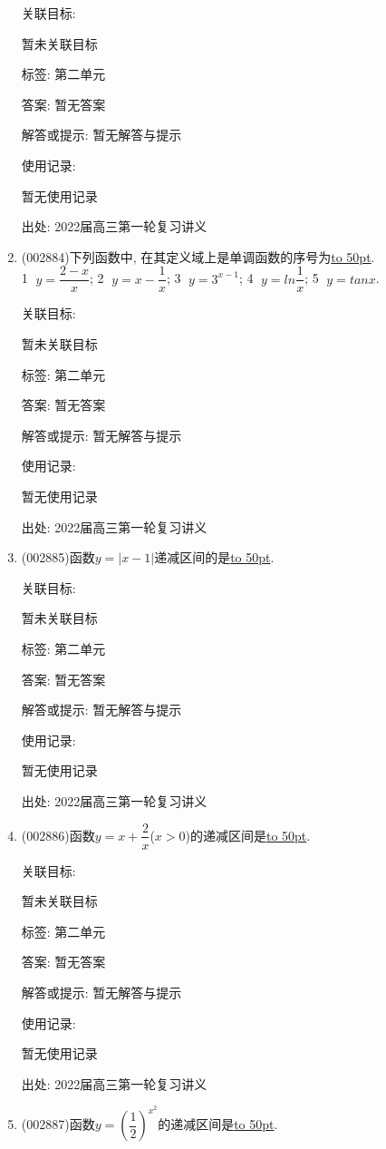 \documentclass[10pt,a4paper]{article}
\newcommand{\blank}[1]{\underline{\hbox to #1pt{}}}
\begin{document}
\begin{enumerate}[1.]
关联目标:

暂未关联目标



标签: 第二单元

答案: 暂无答案

解答或提示: 暂无解答与提示

使用记录:

暂无使用记录


出处: 2022届高三第一轮复习讲义
\item { (002884)}下列函数中, 在其定义域上是单调函数的序号为\blank{50}.\\
\textcircled{1} $y=\dfrac{2-x}x$; \textcircled{2} $y=x-\dfrac 1x$; \textcircled{3} $y={3^{x-1}}$; \textcircled{4} $y=ln\dfrac 1x$; \textcircled{5} $y=tanx$.


关联目标:

暂未关联目标



标签: 第二单元

答案: 暂无答案

解答或提示: 暂无解答与提示

使用记录:

暂无使用记录


出处: 2022届高三第一轮复习讲义
\item { (002885)}函数$y=|x-1|$递减区间的是\blank{50}.


关联目标:

暂未关联目标



标签: 第二单元

答案: 暂无答案

解答或提示: 暂无解答与提示

使用记录:

暂无使用记录


出处: 2022届高三第一轮复习讲义
\item { (002886)}函数$y=x+\dfrac 2x$($x>0$)的递减区间是\blank{50}.


关联目标:

暂未关联目标



标签: 第二单元

答案: 暂无答案

解答或提示: 暂无解答与提示

使用记录:

暂无使用记录


出处: 2022届高三第一轮复习讲义
\item { (002887)}函数$y=(\dfrac 12)^{x^2}$的递减区间是\blank{50}.



\end{enumerate}
\end{document}
